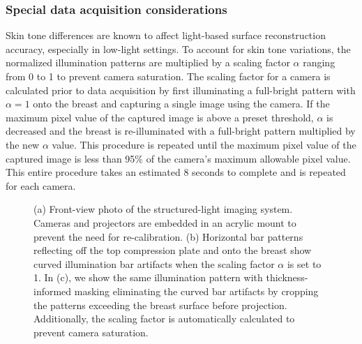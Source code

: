 \subsubsection{Special data acquisition considerations}
\label{sec:special}
Skin tone differences are known to affect light-based surface reconstruction accuracy, especially in low-light settings. To account for skin tone variations, the normalized illumination patterns are multiplied by a scaling factor $\alpha$ ranging from 0 to 1 to prevent camera saturation. The scaling factor for a camera is calculated prior to data acquisition by first illuminating a full-bright pattern with $\alpha=1$ onto the breast and capturing a single image using the camera. If the maximum pixel value of the captured image is above a preset threshold, $\alpha$ is decreased and the breast is re-illuminated with a full-bright pattern multiplied by the new $\alpha$ value. This procedure is repeated until the maximum pixel value of the captured image is less than 95\% of the camera's maximum allowable pixel value. This entire procedure takes an estimated 8 seconds to complete and is repeated for each camera.

\begin{figure}
	\begin{center}
	\end{center}
	\caption{(a) Front-view photo of the structured-light imaging system. Cameras and projectors are embedded in an acrylic mount to prevent the need for re-calibration. (b) Horizontal bar patterns reflecting off the top compression plate and onto the breast show curved illumination bar artifacts when the scaling factor $\alpha$ is set to 1. In (c), we show the same illumination pattern with thickness-informed masking eliminating the curved bar artifacts by cropping the patterns exceeding the breast surface before projection. Additionally, the scaling factor is automatically calculated to prevent camera saturation.} 
	\label{fig:barartifacts}
\end{figure} 

